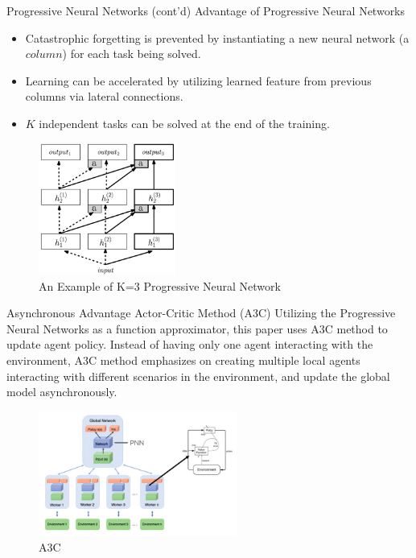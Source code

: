 \documentclass[final, hyperref={pdfpagelabels=false}]{beamer}
\begin{document}
\begin{frame}{}
\begin{columns}[t]
\begin{column}{.30\linewidth}
    \begin{block}{Progressive Neural Networks\cite{rusu2016progressive} (cont'd)}
        Advantage of Progressive Neural Networks
        \begin{itemize}
            \item Catastrophic forgetting is prevented by instantiating a new neural network (a $column$) for each task being solved.
            \item Learning can be accelerated by utilizing learned feature from previous columns via lateral connections.
            \item $K$ independent tasks can be solved at the end of the training.
        \end{itemize}
        \vspace{0.5in}
        \begin{figure}
          \includegraphics[width=0.4\textwidth]{img/pnn.png}
          \caption{An Example of K=3 Progressive Neural Network}
          \label{fig:pnn}
        \end{figure}
    \end{block}
    
    \begin{block}{Asynchronous Advantage Actor-Critic Method (A3C) \cite{DBLP:journals/corr/MnihBMGLHSK16}}
    Utilizing the Progressive Neural Networks as a function approximator, this paper uses A3C method to update agent policy. Instead of having only one agent interacting with the environment, A3C method emphasizes on creating multiple local agents interacting with different scenarios in the environment, and update the global model asynchronously.
    \begin{figure}
          \includegraphics[width=0.58\textwidth]{img/a3carch.png}
          \caption{A3C}
          \label{fig:A3C}
        \end{figure}
    \end{block}
    \end{column}


\end{columns}
\end{frame}
\end{document}
